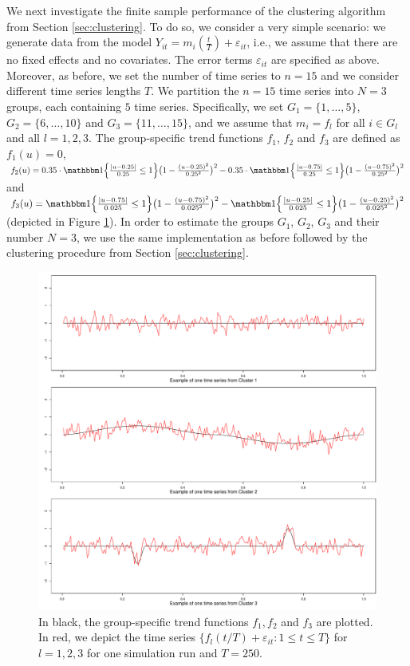 \documentclass[12pt]{article}
\begin{document}
We next investigate the finite sample performance of the clustering algorithm from Section \ref{sec:clustering}. To do so, we consider a very simple scenario: we generate data from the model $Y_{it} = m_i(\frac{t}{T}) + \varepsilon_{it}$, i.e., we assume that there are no fixed effects and no covariates. The error terms $\varepsilon_{it}$ are specified as above. Moreover, as before, we set the number of time series to $n = 15$ and we consider different time series lengths $T$. We partition the $n = 15$ time series into $N=3$ groups, each containing $5$ time series. Specifically, we set $G_1 = \{1,\ldots, 5\}$, $G_2 = \{6,\ldots, 10\}$ and $G_3 =  \{11,\ldots, 15\}$, and we assume that $m_i = f_l$ for all $i \in G_l$ and all $l = 1, 2, 3$. The group-specific trend functions $f_1$, $f_2$ and $f_3$ are defined as $f_1(u) = 0$, $f_2(u) = 0.35 \cdot \ind\Big\{\frac{|u - 0.25|}{0.25}\leq 1\Big\} \big(1 - \frac{(u - 0.25)^2}{0.25^2}\big)^2 - 0.35 \cdot \ind\Big\{\frac{|u - 0.75|}{0.25}\leq 1\Big\} \big(1 - \frac{(u - 0.75)^2}{0.25^2}\big)^2$ and $f_3(u) = \ind\Big\{\frac{|u - 0.75|}{0.025}\leq 1\Big\} \big(1 - \frac{(u - 0.75)^2}{0.025^2}\big)^2 - \ind\Big\{\frac{|u - 0.25|}{0.025}\leq 1\Big\} \big(1 - \frac{(u - 0.25)^2}{0.025^2}\big)^2$ (depicted in Figure \ref{fig:clustering_fcts}). In order to estimate the groups $G_1$, $G_2$, $G_3$ and their number $N = 3$, we use the same implementation as before followed by the clustering procedure from Section \ref{sec:clustering}. 
\begin{figure}[t!]
\includegraphics[width=\textwidth]{../output/clustering_functions.pdf}
\caption{In black, the group-specific trend functions $f_1, f_2$ and $f_3$ are plotted. In red, we depict the time series $\{f_l(t/T) + \varepsilon_{it}: 1 \le t \le T\}$ for $l = 1, 2, 3$ for one simulation run and $T=250$.}\label{fig:clustering_fcts}
\end{figure}
\end{document}

